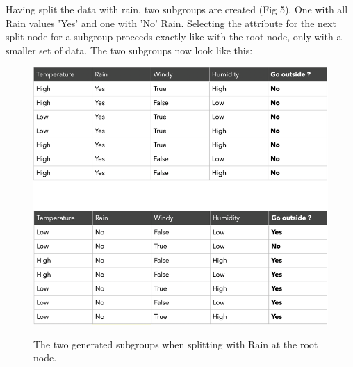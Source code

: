 \documentclass[
12pt,
headsepline,
bibliography=totoc,
twoside=semi,
fleqn
]{scrartcl}
\begin{document}
 Having split the data with rain, two subgroups are created (Fig 5). One with all Rain values 'Yes' and one with 'No' Rain. Selecting the attribute for the next split node for a subgroup proceeds exactly like with the root node, only with a smaller set of data. The two subgroups now look like this: \\
 

 \begin{figure}[H]
 \centering\includegraphics[scale=0.7]{BDT10.png}\label{fig:fig10}
 \caption{The two generated subgroups when splitting with Rain at the root node.}
 \end{figure}
\end{document}
